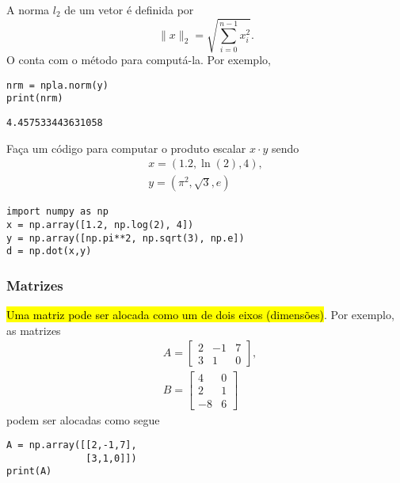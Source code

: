 A norma $l_2$ de um vetor é definida por
\begin{equation}
  \|x\|_2 = \sqrt{\sum_{i=0}^{n-1} x_i^2}.
\end{equation}
O {\numpy} conta com o método \hl{\PYTHONnumpyDOTlinalgDOTnorm} para computá-la. Por exemplo,

\begin{lstlisting}
nrm = npla.norm(y)
print(nrm)
\end{lstlisting}

\begin{verbatim}
4.457533443631058
\end{verbatim}

\begin{exer}
  Faça um código para computar o produto escalar $x\cdot y$ sendo
  \begin{gather}
    x = (1.2, \ln(2), 4),\\
    y = (\pi^2, \sqrt{3}, e)
  \end{gather}
\end{exer}
\begin{resp}

\begin{lstlisting}
import numpy as np
x = np.array([1.2, np.log(2), 4])
y = np.array([np.pi**2, np.sqrt(3), np.e])
d = np.dot(x,y)
\end{lstlisting}

\end{resp}


\subsubsection{Matrizes}\label{sec_alglin}

\hl{Uma matriz pode ser alocada como um {\PYTHONnumpyDOTarray} de dois eixos (dimensões)}. Por exemplo, as matrizes
\begin{align}
  &A =
  \begin{bmatrix}
    2 & -1 & 7\\
    3 & 1 & 0
  \end{bmatrix},\label{sec_alglin:eq:A}\\
  &B =
  \begin{bmatrix}
    4 & 0\\
    2 & 1\\
   -8 & 6
  \end{bmatrix}\label{sec_alglin:eq:B}
\end{align}
podem ser alocadas como segue

\begin{lstlisting}
A = np.array([[2,-1,7],
              [3,1,0]])
print(A)
\end{lstlisting}

